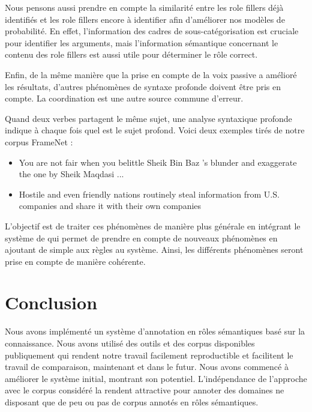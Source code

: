 Nous pensons aussi prendre en compte la similarité entre les role fillers déjà
identifiés et les role fillers encore à identifier afin d'améliorer nos modèles
de probabilité. En effet, l'information des cadres de sous-catégorisation est
cruciale pour identifier les arguments, mais l'information sémantique
concernant le contenu des role fillers est aussi utile pour déterminer le rôle
correct.

Enfin, de la même manière que la prise en compte de la voix passive a amélioré
les résultats, d'autres phénomènes de syntaxe profonde doivent être pris en
compte. La coordination est une autre source commune d'erreur.

Quand deux verbes partagent le même sujet, une analyse syntaxique profonde
indique à chaque fois quel est le sujet profond. Voici deux exemples tirés de
notre corpus FrameNet :

\begin{itemize}
    \item You are not fair when you belittle Sheik Bin Baz 's blunder and
          exaggerate the one by Sheik Maqdasi ...
    \item Hostile and even friendly nations routinely steal information from
          U.S. companies and share it with their own companies
\end{itemize}

L'objectif est de traiter ces phénomènes de manière plus générale en intégrant
le système de \cite{ribeyre2013systeme} qui permet de prendre en compte de
nouveaux phénomènes en ajoutant de simple aux règles au système. Ainsi, les
différents phénomènes seront prise en compte de manière cohérente.

\section{Conclusion}

Nous avons implémenté un système d'annotation en rôles sémantiques basé sur la
connaissance. Nous avons utilisé des outils et des corpus disponibles
publiquement qui rendent notre travail facilement reproductible et facilitent
le travail de comparaison, maintenant et dans le futur. Nous avons commencé à
améliorer le système initial, montrant son potentiel. L'indépendance de
l'approche avec le corpus considéré la rendent attractive pour annoter des
domaines ne disposant que de peu ou pas de corpus annotés en rôles sémantiques.
